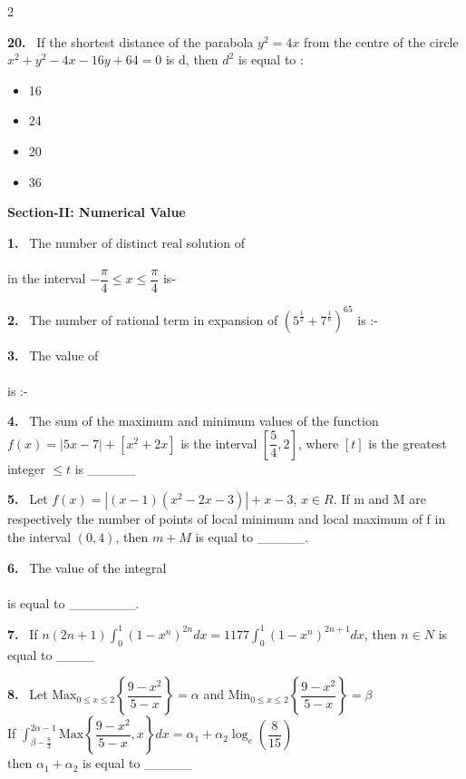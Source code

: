 \documentclass[10pt]{extarticle}
\newcommand{\sect}[1]{\par\smallskip\noindent\textbf{#1}\par}
\newcommand{\qn}[1]{\par\smallskip\noindent\textbf{#1.}~}
\newenvironment{qoptions}{\begin{itemize}[leftmargin=1.8em,itemsep=1pt,topsep=2pt,label={}]}{\end{itemize}}
\newcommand{\opt}[2]{\item[(#1)] #2}
\begin{document}
\begin{multicols}{2}
\qn{20} If the shortest distance of the parabola $y^2=4x$ from the centre of the circle $x^2+y^2-4x-16y+64=0$ is d, then $d^2$ is equal to :
\begin{qoptions}
\opt{A}{16}
\opt{B}{24}
\opt{C}{20}
\opt{D}{36}
\end{qoptions}

\sect{Section-II: Numerical Value}

\qn{1} The number of distinct real solution of\\
\\
in the interval $-\dfrac\pi4\le x\le\dfrac\pi4$ is-

\qn{2} The number of rational term in expansion of $\left(5^{\frac12}+7^{\frac16}\right)^{65}$ is :-

\qn{3} The value of\\
\\
is :-

\qn{4} The sum of the maximum and minimum values of the function $f(x)=|5x-7|+[x^2+2x]$ is the interval $\left[\dfrac54,2\right]$, where $[t]$ is the greatest integer $\le t$ is \_\_\_\_\_

\qn{5} Let $f(x)=\left|(x-1)(x^2-2x-3)\right|+x-3$, $x\in R$. If m and M are respectively the number of points of local minimum and local maximum of f in the interval $(0,4)$, then $m+M$ is equal to \_\_\_\_\_.

\qn{6} The value of the integral\\
\\
is equal to \_\_\_\_\_\_\_.

\qn{7} If $n(2n+1)\displaystyle\int_0^1(1-x^n)^{2n}dx=1177\displaystyle\int_0^1(1-x^n)^{2n+1}dx$, then $n\in N$ is equal to \_\_\_\_

\qn{8} Let $\displaystyle\text{Max}_{0\le x\le2}\left\{\dfrac{9-x^2}{5-x}\right\}=\alpha$ and $\displaystyle\text{Min}_{0\le x\le2}\left\{\dfrac{9-x^2}{5-x}\right\}=\beta$\\
If $\displaystyle\int_{\beta-\frac83}^{2\alpha-1}\text{Max}\left\{\dfrac{9-x^2}{5-x},x\right\}dx=\alpha_1+\alpha_2\log_e\left(\dfrac{8}{15}\right)$\\
then $\alpha_1+\alpha_2$ is equal to \_\_\_\_\_


\end{multicols}
\end{document}
